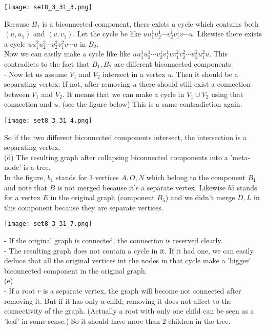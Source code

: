 \documentclass{article}
\begin{document}
\begin{center}
	\centering
	\texttt{[image: set8\_3\_31\_3.png]}
\end{center}
Because $B_1$ is a biconnected component, there exists a cycle which contains both $(u,u_1)$ and $(v,v_1)$. Let the cycle be like $uu_1^1u_2^1\cdots v_2^1v_1^1v\cdots u$. Likewise there exists a cycle $uu_1^2u_2^2\cdots v_2^2v_1^2v\cdots u$ in $B_2$.\\ Now we can easily make a cycle like like $uu_1^1u_2^1\cdots v_2^1v_1^1vv_1^2v_2^2\cdots u_2^2u_1^2u$. This contradicts to the fact that $B_1, B_2$ are different biconnected components.\\
- Now let us assume $V_1$ and $V_2$ intersect in a vertex $u$. Then it should be a separating vertex. If not, after removing $u$ there should still exist a connection between $V_1$ and $V_2$. It means that we can make a cycle in $V_1\cup V_2$ using that connection and $u$. (see the figure below) This is a same contradiction again.
\begin{center}
	\centering
	\texttt{[image: set8\_3\_31\_4.png]}
\end{center}
So if  the two different biconnected components intersect, the intersection is a separating vertex.\\
(d) The resulting graph after collapsing biconnected components into a 'meta-node' is a tree.\\
In the figure, $b_1$ stands for 3 vertices $A, O, N$ which belong to the component $B_1$ and note that $B$ is not merged because it's a separate vertex. Likewise $b5$ stands for a vertex $E$ in the original graph (component $B_5$) and we didn't merge $D, L$ in this component because they are separate vertices.
\begin{center}
	\centering
	\texttt{[image: set8\_3\_31\_7.png]}
\end{center}
- If the original graph is connected, the connection is reserved clearly.\\
- The resulting graph does not contain a cycle in it. If it had one, we can easily deduce that all the original vertices int the nodes in that cycle make a 'bigger' biconnected component in the original graph. \\
(e)\\
- If a root $r$ is a separate vertex, the graph will become not connected after removing it. But if it has only a child, removing it does not affect to the connectivity of the graph. (Actually a root with only one child can be seen as a 'leaf' in some sense.) So it should have more than 2 children in the tree.\\
\end{document}
